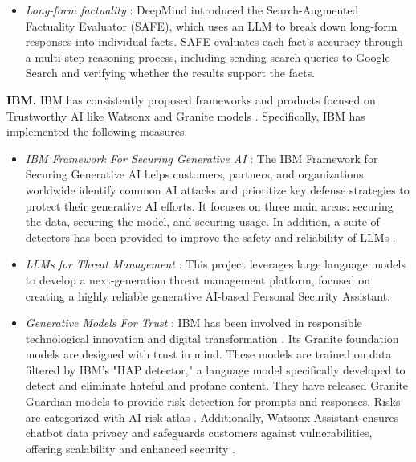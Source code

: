 \begin{itemize}[nolistsep, leftmargin=15pt]
    \item[] \textcolor[HTML]{f7f7f7}{\largedot} {\textit{Long-form factuality}} \cite{wei2024longformfactualitylargelanguage}: DeepMind introduced the Search-Augmented Factuality Evaluator (SAFE), which uses an LLM to break down long-form responses into individual facts. SAFE evaluates each fact’s accuracy through a multi-step reasoning process, including sending search queries to Google Search and verifying whether the results support the facts.
\end{itemize}


\textbf{IBM.} 
IBM has consistently proposed frameworks and products focused on Trustworthy AI like Watsonx \cite{ibmWatsonxAssistantSecurity} and Granite models \cite{ibmGraniteFoundationModels}. Specifically, IBM has implemented the following measures:

\begin{itemize}[nolistsep, leftmargin=15pt]
    \item[] \textcolor[HTML]{1c6cbb}{\largedot} {\textit{IBM Framework For Securing Generative AI}} \cite{ibmGenerativeAISecurity}: The IBM Framework for Securing Generative AI helps customers, partners, and organizations worldwide identify common AI attacks and prioritize key defense strategies to protect their generative AI efforts. It focuses on three main areas: securing the data, securing the model, and securing usage. In addition, a suite of detectors has been provided to improve the safety and reliability of LLMs \cite{achintalwar2024detectors}.
    \item[] \textcolor[HTML]{1c6cbb}{\largedot} {\textit{LLMs for Threat Management}} \cite{ibmLLMsThreatManagement}: This project leverages large language models to develop a next-generation threat management platform, focused on creating a highly reliable generative AI-based Personal Security Assistant.
    \item[] \textcolor[HTML]{1c6cbb}{\largedot} {\textit{Generative Models For Trust}} \cite{ibmGraniteFoundationModels, ibmWatsonxAssistantSecurity}:  IBM has been involved in responsible technological innovation and digital transformation \cite{ResponsibleUseIBM}. Its Granite foundation models \cite{ibmGraniteFoundationModels} are designed with trust in mind. These models are trained on data filtered by IBM's "HAP detector," a language model specifically developed to detect and eliminate hateful and profane content. They have released Granite Guardian models \cite{padhi2024granite} to provide risk detection for prompts and responses. Risks are categorized with AI risk atlas \cite{ibmai-risk-atlas}. Additionally, Watsonx Assistant ensures chatbot data privacy and safeguards customers against vulnerabilities, offering scalability and enhanced security \cite{ibmWatsonxAssistantSecurity}.
\end{itemize}

